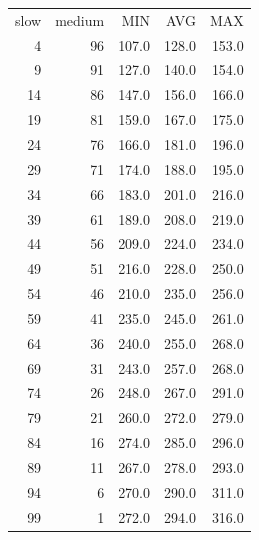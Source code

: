 \documentclass[12pt,letterpaper]{article}
\begin{document}
\begin{tabular}{ r | r | r | r | r }
slow & medium & MIN   & AVG   & MAX \\
   4 & 96     & 107.0 & 128.0 & 153.0 \\
   9 & 91     & 127.0 & 140.0 & 154.0 \\
  14 & 86     & 147.0 & 156.0 & 166.0 \\
  19 & 81     & 159.0 & 167.0 & 175.0 \\
  24 & 76     & 166.0 & 181.0 & 196.0 \\
  29 & 71     & 174.0 & 188.0 & 195.0 \\
  34 & 66     & 183.0 & 201.0 & 216.0 \\
  39 & 61     & 189.0 & 208.0 & 219.0 \\
  44 & 56     & 209.0 & 224.0 & 234.0 \\
  49 & 51     & 216.0 & 228.0 & 250.0 \\
  54 & 46     & 210.0 & 235.0 & 256.0 \\
  59 & 41     & 235.0 & 245.0 & 261.0 \\
  64 & 36     & 240.0 & 255.0 & 268.0 \\
  69 & 31     & 243.0 & 257.0 & 268.0 \\
  74 & 26     & 248.0 & 267.0 & 291.0 \\
  79 & 21     & 260.0 & 272.0 & 279.0 \\
  84 & 16     & 274.0 & 285.0 & 296.0 \\
  89 & 11     & 267.0 & 278.0 & 293.0 \\
  94 &  6     & 270.0 & 290.0 & 311.0 \\
  99 &  1     & 272.0 & 294.0 & 316.0 \\
\end{tabular}  
%
%
\end{document}
